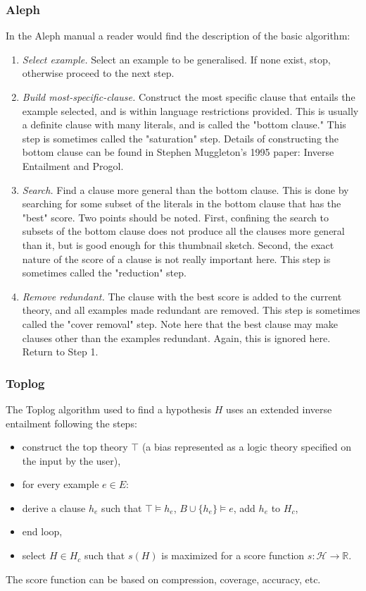 \subsubsection{Aleph}
In the Aleph manual\cite{aleph2007} a reader would find the description of the basic algorithm:
\begin{enumerate}
\item \emph{Select example.} Select an example to be generalised. If none exist, stop, otherwise proceed to the next step.
\item \emph{Build most-specific-clause.} Construct the most specific clause that entails the example selected, and is within language restrictions provided. This is usually a definite clause with many literals, and is called the "bottom clause." This step is sometimes called the "saturation" step. Details of constructing the bottom clause can be found in Stephen Muggleton's 1995 paper: Inverse Entailment and Progol\cite{muggleton1995inverse}.
\item \emph{Search.} Find a clause more general than the bottom clause. This is done by searching for some subset of the literals in the bottom clause that has the "best" score. Two points should be noted. First, confining the search to subsets of the bottom clause does not produce all the clauses more general than it, but is good enough for this thumbnail sketch. Second, the exact nature of the score of a clause is not really important here. This step is sometimes called the "reduction" step.
\item \emph{Remove redundant.} The clause with the best score is added to the current theory, and all examples made redundant are removed. This step is sometimes called the "cover removal" step. Note here that the best clause may make clauses other than the examples redundant. Again, this is ignored here. Return to Step 1.
\end{enumerate}

\subsubsection{Toplog\cite{muggleton2008toplog}\cite{corapi2011nonmonotonic}}
The Toplog algorithm used to find a hypothesis $H$ uses an extended inverse entailment following the steps:

\begin{itemize}
\item construct the top theory $\top$ (a bias represented as a logic theory specified on the input by the user),
\item for every example $e \in E$:
\item derive a clause $h_e$ such that $\top \models h_e$, $B \cup \{h_e\} \models e$, add $h_e$ to $H_c$,
\item end loop,
\item select $H \in H_c$ such that $s(H)$ is maximized for a score function $s:\mathcal{H} \to \mathbb{R}$.
\end{itemize}
The score function can be based on compression, coverage, accuracy, etc.

